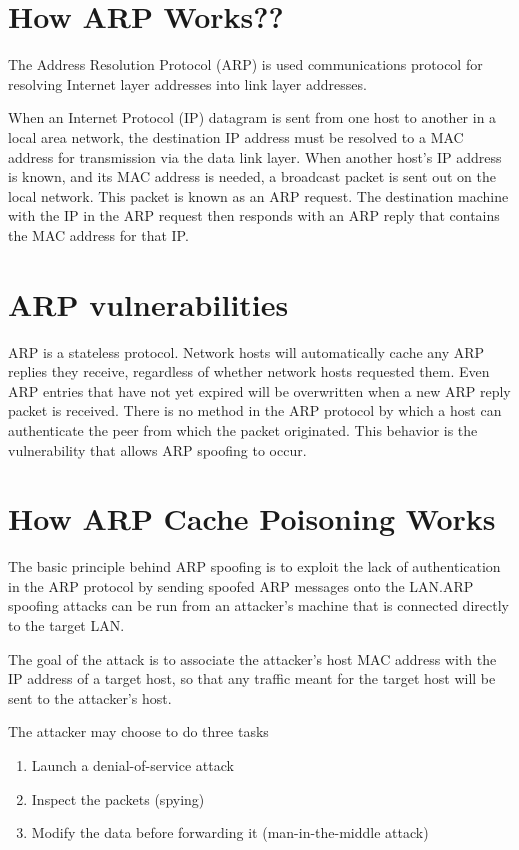 \documentclass{article}
\begin{document}
\section{How ARP Works??}
The Address Resolution Protocol (ARP) is used communications protocol for resolving Internet layer addresses into link layer addresses.

When an Internet Protocol (IP) datagram is sent from one host to another in a local area network, the destination IP address must be resolved to a MAC address for transmission via the data link layer. When another host's IP address is known, and its MAC address is needed, a broadcast packet is sent out on the local network. This packet is known as an ARP request. The destination machine with the IP in the ARP request then responds with an ARP reply that contains the MAC address for that IP.

\section{ARP vulnerabilities}
ARP is a stateless protocol. Network hosts will automatically cache any ARP replies they receive, regardless of whether network hosts requested them. Even ARP entries that have not yet expired will be overwritten when a new ARP reply packet is received. There is no method in the ARP protocol by which a host can authenticate the peer from which the packet originated. This behavior is the vulnerability that allows ARP spoofing to occur.

\section{How ARP Cache Poisoning Works}

The basic principle behind ARP spoofing is to exploit the lack of authentication in the ARP protocol by sending spoofed ARP messages onto the LAN.ARP spoofing attacks can be run  from an attacker's machine that is connected directly to the target LAN.

\par  The goal of the attack is to associate the attacker's host MAC address with the IP address of a target host, so that any traffic meant for the target host will be sent to the attacker's host.


\par The attacker may choose to do three tasks 
 
\begin{enumerate}
\item  Launch a denial-of-service attack
\item  Inspect the packets (spying)
\item Modify the data before forwarding it (man-in-the-middle attack)
\end{enumerate}
\end{document}

